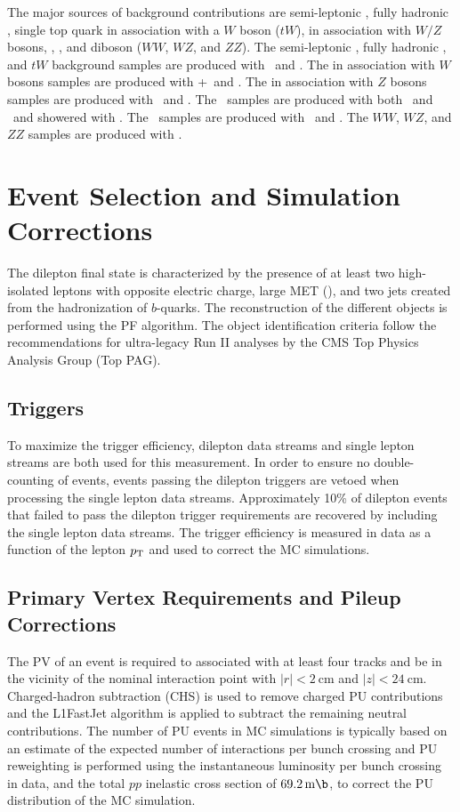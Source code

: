 The major sources of background contributions are semi-leptonic \ttbar, fully hadronic \ttbar, single top quark in association with a $W$ boson ($tW$), \ttbar in association with $W/Z$ bosons, \zjets, \wjets, and diboson ($WW$, $WZ$, and $ZZ$). 
The semi-leptonic \ttbar, fully hadronic \ttbar, and $tW$ background samples are produced with \Powheg\ and \Pythia. 
The \ttbar in association with $W$ bosons samples are produced with \MGaMCatNLOOnly+\MadSpin\ and \Pythia.
The \ttbar in association with $Z$ bosons samples are produced with \MGaMCatNLO\ and \Pythia.
The \zjets\ samples are produced with both \MGMLM\ and \MGaMCatNLO\ and showered with \Pythia.
The \wjets\ samples are produced with \MGMLM\ and \Pythia.
The $WW$, $WZ$, and $ZZ$ samples are produced with \Pythia.

\section{Event Selection and Simulation Corrections}
The \ttbar dilepton final state is characterized by the presence of at least two high-\pT isolated leptons with opposite electric charge, large MET (\ETmiss), and two jets created from the hadronization of $b$-quarks.
The reconstruction of the different objects is performed using the PF algorithm.
The object identification criteria follow the recommendations for ultra-legacy Run II analyses by the CMS Top Physics Analysis Group (Top PAG).

\subsection{Triggers}
To maximize the trigger efficiency, dilepton data streams and single lepton streams are both used for this measurement.
In order to ensure no double-counting of events, events passing the dilepton triggers are vetoed when processing the single lepton data streams.
Approximately 10\% of dilepton events that failed to pass the dilepton trigger requirements are recovered by including the single lepton data streams.
The trigger efficiency is measured in data as a function of the lepton $p_{\mathrm{T}}$ and used to correct the MC simulations.

\subsection{Primary Vertex Requirements and Pileup Corrections}
The PV of an event is required to associated with at least four tracks and be in the vicinity of the nominal interaction point with $\vert r \vert < \SI{2}{\cm}$ and $\vert z \vert < \SI{24}{\cm}$. 
Charged-hadron subtraction (CHS) is used to remove charged PU contributions and the L1FastJet algorithm is applied to subtract the remaining neutral contributions.
The number of PU events in MC simulations is typically based on an estimate of the expected number of interactions per bunch crossing and PU reweighting is performed using the instantaneous luminosity per bunch crossing in data, and the total $pp$ inelastic cross section of $\SI{69.2}{\m \b}$, to correct the PU distribution of the MC simulation.

